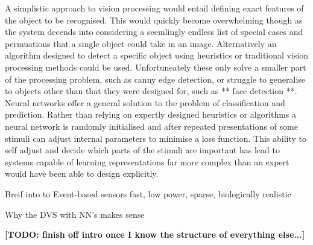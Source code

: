 A simplistic approach to vision processing would entail defining exact features of the object to be recognised.
This would quickly become overwhelming though as the system decends into considering a seemlingly endless list of special cases and permuations that a single object could take in an image.
Alternatively an algorithm designed to detect a specific object using heuristics or traditional vision processing methods could be used.
Unfortuneately these only solve a smaller part of the processing problem, such as canny edge detection, or struggle to generalise to objects other than that they were designed for, such as ** face detection **.
Neural networks offer a general solution to the problem of classification and prediction.
Rather than relying on expertly designed heuristics or algorithms a neural network is randomly initialised and after repeated presentations of some stimuli can adjust internal parameters to minimise a loss function. 
This ability to self adjust and decide which parts of the stimuli are important has lead to systems capable of learning representations far more complex than an expert would have been able to design explicitly. 


Breif into to Event-based sensors \hfill 
   fast, low power, sparse, biologically realistic \hfill

Why the DVS with NN's makes sense \hfill 

\textbf{[TODO: finish off intro once I know the structure of everything else...]}
